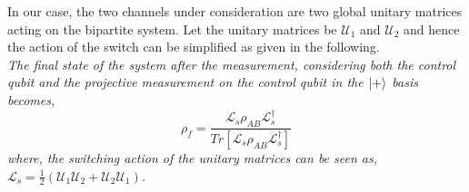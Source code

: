 In our case, the two channels under consideration are two global unitary matrices acting on the bipartite system. Let the unitary matrices be $\mathcal{U}_1$ and $\mathcal{U}_2$ and hence the action of the switch can be simplified as given in the following.\\
\textit{The final state of the system after the measurement, considering both the control qubit and the projective measurement on the control qubit in the $\ket{+}$ basis becomes,
\begin{equation}
    \rho_f=\frac{\mathcal{L}_s \rho_{AB} \mathcal{L}_s^{\dagger}}{ Tr[\mathcal{L}_s \rho_{AB} \mathcal{L}_s^{\dagger}]}
    \label{finalstate_switch}
\end{equation}
where, the switching action of the unitary matrices can be seen as, $\mathcal{L}_s=\frac{1}{2}(\mathcal{U}_1 \mathcal{U}_2+\mathcal{U}_2 \mathcal{U}_1)$.}

